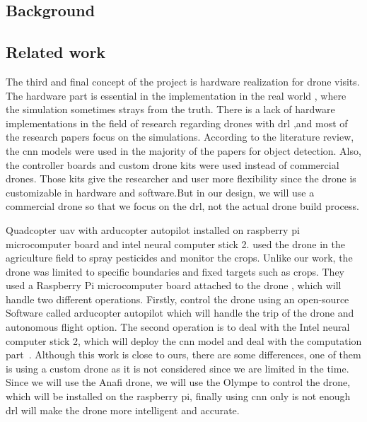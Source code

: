 \documentclass[../main.tex]{subfiles}
\begin{document}
\subsection{Background}

\blindtext

\subsection{Related work}


		The third and final concept of the project is hardware realization for drone visits.
		The hardware part is essential in the implementation in the real world
		, where the simulation sometimes strays from the truth.
		There is a lack of hardware implementations in the field of research regarding drones with \gls{drl}
		 ,and most of the research papers focus on the simulations.
		According to the literature review, 
		the \gls{cnn} models were used in the majority of the papers for object detection. 
		Also, the controller boards and custom drone kits were used instead of commercial drones.
		Those kits give the researcher and user more flexibility since the drone is customizable 
		in hardware and software.But in our design, we will use a commercial drone so that we focus
		 on the \gls{drl}, not the actual drone build process. 


	Quadcopter \gls{uav} with arducopter autopilot installed on raspberry pi
	 microcomputer board and intel neural computer stick 2.
	\citeauthor{Khan21} used the drone in the agriculture field to spray 
	pesticides and monitor the crops. Unlike our work, the drone was limited to specific
	boundaries and fixed targets such as crops.
	They used a Raspberry Pi microcomputer board attached to the drone
	, which will handle two different operations. Firstly, control the drone using an open-source
	 Software called arducopter autopilot which will handle the trip of the drone and autonomous 
	 flight option. The second operation is to deal with the Intel neural computer stick 2, 
	 which will deploy the \gls{cnn} model and deal with the computation part~\cite{Khan21}.
	Although this work is close to ours, there are some differences, 
	one of them is using a custom drone as it is not considered since we are limited in the time.
	Since we will use the Anafi drone, we will use the Olympe to control the drone, which will
	 be installed on the raspberry pi, finally using \gls{cnn} only is not enough \gls{drl} 
	 will make the drone more intelligent and accurate.
\end{document}
